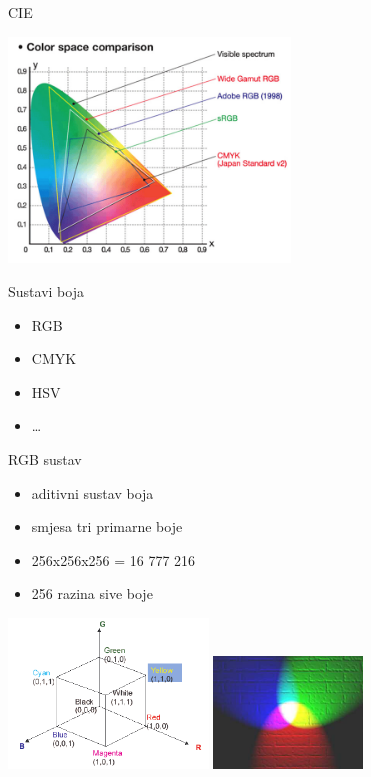 \documentclass[9pt]{beamer}
\begin{document}
\begin{frame}{CIE}
	\begin{center}
		\includegraphics[height=6cm]{slike/cie_gamuts.jpg}
	\end{center}
\end{frame}

\begin{frame}{Sustavi boja}
	\begin{itemize}
		\item RGB
		\item CMYK
		\item HSV
		\item \ldots
	\end{itemize}
\end{frame}

\begin{frame}{RGB sustav}
	\begin{itemize}
		\item aditivni sustav boja
		\item smjesa tri primarne boje
		\item 256x256x256 = 16 777 216
		\item 256 razina sive boje
	\end{itemize}
	\begin{center}
		\includegraphics[height=4cm]{slike/03_rgb_01.png}
		\includegraphics[height=3cm]{slike/03_rgb_02.png}
	\end{center}
\end{frame}
\end{document}
